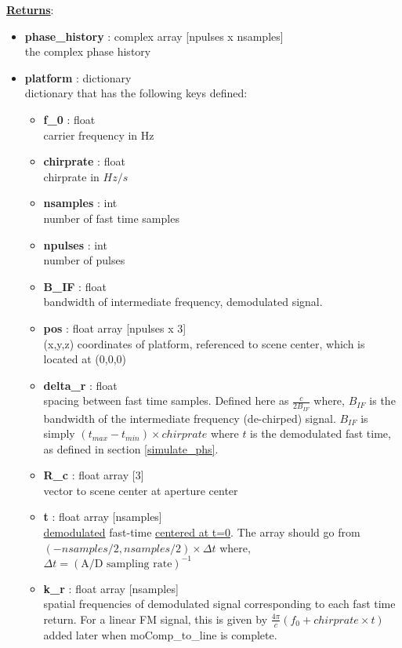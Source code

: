 \documentclass{article}
\newcommand{\defs}[2]{\textbf{{#1}} : {#2}}
\begin{document}
\noindent \underline{\textbf{Returns}}:
\begin{itemize}
	\item \defs{phase\_history}{complex array [npulses x nsamples]}\\
		the complex phase history
	  \item \defs{platform}{dictionary}\\
	  	dictionary that has the following keys defined:
	  \begin{itemize}
	    \item \defs{f\_0}{float}\\
	    	carrier frequency in Hz
		\item \defs{chirprate}{float}\\
		   	chirprate in $Hz/s$
	    \item \defs{nsamples}{int}\\
	    	number of fast time samples
	    \item \defs{npulses}{int}\\
	    	number of pulses
	    \item \defs{B\_IF}{float}\\
	    	bandwidth of intermediate frequency, demodulated signal.
	    \item \defs{pos}{float array [npulses x 3]}\\
	       	(x,y,z) coordinates of platform, referenced to scene center, which is located at (0,0,0)
	    \item \defs{delta\_r}{float}\\
       	   	spacing between fast time samples.  Defined here as $\frac{c}{2B_{IF}}$ where, $B_{IF}$ is the bandwidth of the intermediate frequency (de-chirped) signal.  $B_{IF}$ is simply $(t_{max}-t_{min})\times chirprate$ where $t$ is the demodulated fast time, as defined in section \ref{simulate_phs}.
	    \item \defs{R\_c}{float array [3]}\\
	     	vector to scene center at aperture center
	    \item \defs{t}{float array [nsamples]}\\
   	    	\underline{demodulated} fast-time \underline{centered at t=0}.  The array should go from $(-nsamples/2, nsamples/2)\times\Delta t$ where, $\Delta t = (\mbox{A/D sampling rate})^{-1}$
   	    \item\defs{k\_r}{float array [nsamples]}\\
   	    	spatial frequencies of demodulated signal corresponding to each fast time return.  For a linear FM signal, this is given by $\frac{4\pi}{c}(f_0+chirprate\times t)$ added later when moComp\_to\_line is complete.
	  \end{itemize}
\end{itemize}

\nocite*{}


\end{document}
